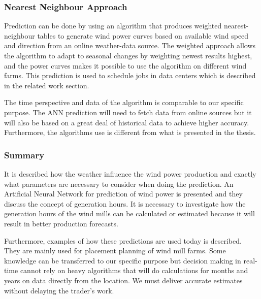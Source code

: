 \subsubsection{Nearest Neighbour Approach}
Prediction can be done by using an algorithm that produces weighted nearest-neighbour tables to generate wind power curves based on available wind speed and direction from an online weather-data source. The weighted approach allows the algorithm to adapt to seasonal changes by weighting newest results highest, and the power curves makes it possible to use the algorithm on different wind farms. This prediction is used to schedule jobs in data centers which is described in the related work section.

The time perspective and data of the algorithm is comparable to our specific purpose. The ANN prediction will need to fetch data from online sources but it will also be based on a great deal of historical data to achieve higher accuracy. Furthermore, the algorithms use is different from what is presented in the thesis. 

\subsubsection{Summary}
It is described how the weather influence the wind power production and exactly what parameters are necessary to consider when doing the prediction. An Artificial Neural Network for prediction of wind power is presented and they discuss the concept of generation hours. It is necessary to investigate how the generation hours of the wind mills can be calculated or estimated because it will result in better production forecasts. 

Furthermore, examples of how these predictions are used today is described. They are mainly used for placement planning of wind mill farms. Some knowledge can be transferred to our specific purpose but decision making in real-time cannot rely on heavy algorithms that will do calculations for months and years on data directly from the location. We must deliver accurate estimates without delaying the trader's work. 
